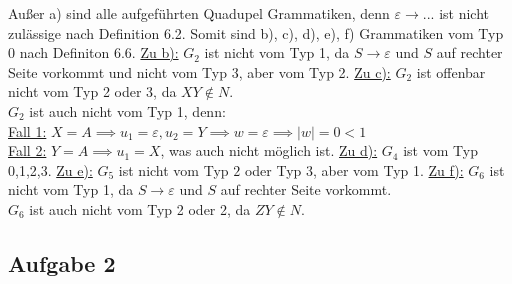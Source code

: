\begin{lösung}
	Außer a) sind alle aufgeführten Quadupel Grammatiken, denn $\varepsilon\to...$ ist nicht zulässige nach Definition 6.2.
	Somit sind b), c), d), e), f) Grammatiken vom Typ 0 nach Definiton 6.6.\nl
	\underline{Zu b):}
	$G_2$ ist nicht vom Typ 1, da $S\to\varepsilon$ und $S$ auf rechter Seite vorkommt und nicht vom Typ 3, aber vom Typ 2.\nl
	\underline{Zu c):}
	$G_2$ ist offenbar nicht vom Typ 2 oder 3, da $XY\not\in N$.\\
	$G_2$ ist auch nicht vom Typ 1, denn:\\
	\underline{Fall 1:} $X=A\implies u_1=\varepsilon,u_2=Y\implies w=\varepsilon\implies |w|=0<1$\\
	\underline{Fall 2:} $Y=A\implies u_1=X$, was auch nicht möglich ist.\nl
	\underline{Zu d):}
	$G_4$ ist vom Typ 0,1,2,3.\nl
	\underline{Zu e):}
	$G_5$ ist nicht vom Typ $2$ oder Typ 3, aber vom Typ 1.\nl
	\underline{Zu f):}
	$G_6$ ist nicht vom Typ 1, da $S\to\varepsilon$ und $S$ auf rechter Seite vorkommt.\\
	$G_6$ ist auch nicht vom Typ 2 oder 2, da $ZY\not\in N$.
\end{lösung}

\subsection{Aufgabe 2}

